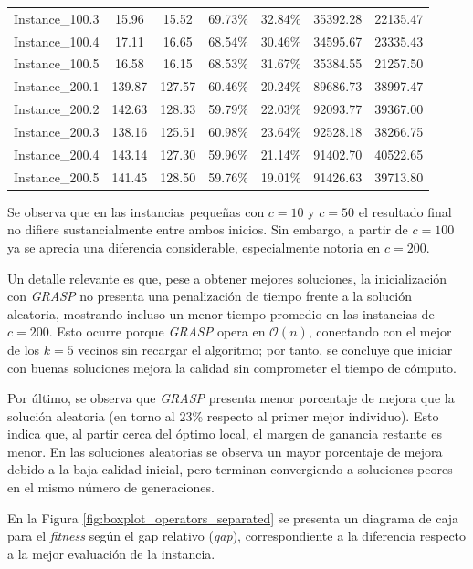 \begin{table}[htbp]
\begin{tabular}{lcccccc}
Instance\_100.3 & 15.96 & 15.52 & 69.73\% & 32.84\% & 35392.28 & 22135.47 \\
Instance\_100.4 & 17.11 & 16.65 & 68.54\% & 30.46\% & 34595.67 & 23335.43 \\
Instance\_100.5 & 16.58 & 16.15 & 68.53\% & 31.67\% & 35384.55 & 21257.50 \\
\midrule
Instance\_200.1 & 139.87 & 127.57 & 60.46\% & 20.24\% & 89686.73 & 38997.47 \\
Instance\_200.2 & 142.63 & 128.33 & 59.79\% & 22.03\% & 92093.77 & 39367.00 \\
Instance\_200.3 & 138.16 & 125.51 & 60.98\% & 23.64\% & 92528.18 & 38266.75 \\
Instance\_200.4 & 143.14 & 127.30 & 59.96\% & 21.14\% & 91402.70 & 40522.65 \\
Instance\_200.5 & 141.45 & 128.50 & 59.76\% & 19.01\% & 91426.63 & 39713.80 \\
\bottomrule
\end{tabular}
\end{table}

Se observa que en las instancias pequeñas con $c=10$ y $c=50$ el resultado final no difiere sustancialmente entre ambos inicios. Sin embargo, a partir de $c=100$ ya se aprecia una diferencia considerable, especialmente notoria en $c=200$.

Un detalle relevante es que, pese a obtener mejores soluciones, la inicialización con \textit{GRASP} no presenta una penalización de tiempo frente a la solución aleatoria, mostrando incluso un menor tiempo promedio en las instancias de $c=200$. Esto ocurre porque \textit{GRASP} opera en $\mathcal{O}(n)$, conectando con el mejor de los $k=5$ vecinos sin recargar el algoritmo; por tanto, se concluye que iniciar con buenas soluciones mejora la calidad sin comprometer el tiempo de cómputo.

Por último, se observa que \textit{GRASP} presenta menor porcentaje de mejora que la solución aleatoria (en torno al $23\%$ respecto al primer mejor individuo). Esto indica que, al partir cerca del óptimo local, el margen de ganancia restante es menor. En las soluciones aleatorias se observa un mayor porcentaje de mejora debido a la baja calidad inicial, pero terminan convergiendo a soluciones peores en el mismo número de generaciones.

En la Figura \ref{fig:boxplot_operators_separated} se presenta un diagrama de caja para el \textit{fitness} según el gap relativo (\textit{gap}), correspondiente a la diferencia respecto a la mejor evaluación de la instancia.

